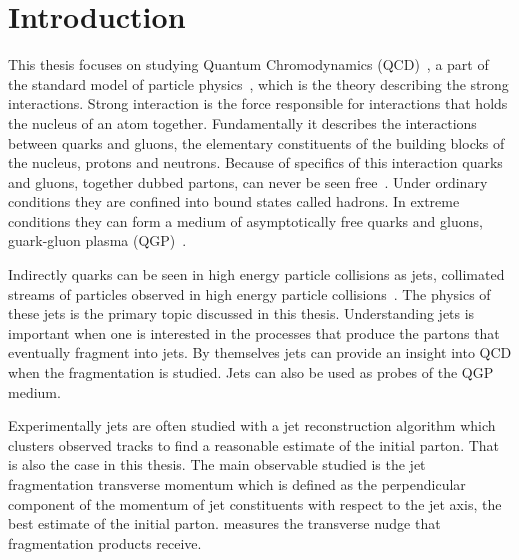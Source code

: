 

\begin{abstract}

\end{abstract}
\tableofcontents

\clearpage
\section{Introduction}
\label{sec:introduction}
This thesis focuses on studying Quantum Chromodynamics (QCD)~\cite{gross1973asymptotically}, a part of the standard model of particle physics~\cite{Tanabashi:2018oca}, which is the theory describing the strong interactions. Strong interaction is the force responsible for interactions that holds the nucleus of an atom together. Fundamentally it describes the interactions between quarks and gluons, the elementary constituents of the building blocks of the nucleus, protons and neutrons. Because of specifics of this interaction quarks and gluons, together dubbed partons, can never be seen free~\cite{Perl:2004qc}. Under ordinary conditions they are confined into bound states called hadrons. In extreme conditions they can form a medium of asymptotically free quarks and gluons, guark-gluon plasma (QGP)~\cite{Shuryak:1980}. %

Indirectly quarks can be seen in high energy particle collisions as jets, collimated streams of particles observed in high energy particle collisions~\cite{Perkins:1982xb}. The physics of these jets is the primary topic discussed in this thesis. Understanding jets is important when one is interested in the processes that produce the partons that eventually fragment into jets. By themselves jets can provide an insight into QCD when the fragmentation is studied. Jets can also be used as probes of the QGP medium. 

Experimentally jets are often studied with a jet reconstruction algorithm which clusters observed tracks to find a reasonable estimate of the initial parton. That is also the case in this thesis. The main observable studied is the jet fragmentation transverse momentum \jt{} which is defined as the perpendicular component of the momentum of jet constituents with respect to the jet axis, the best estimate of the initial parton. \jt{} measures the transverse nudge that fragmentation products receive.

